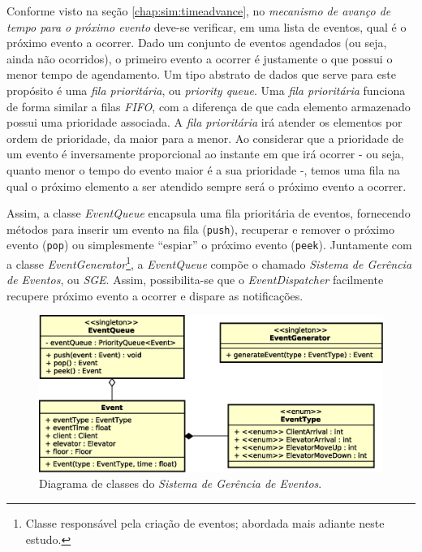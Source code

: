 Conforme visto na seção \ref{chap:sim:timeadvance}, no \textit{mecanismo de
avanço de tempo para o próximo evento} deve-se verificar, em uma lista de
eventos, qual é o próximo evento a ocorrer. Dado um conjunto de eventos
agendados (ou seja, ainda não ocorridos), o primeiro evento a ocorrer é
justamente o que possui o menor tempo de agendamento. Um tipo abstrato de dados
que serve para este propósito é uma \textit{fila prioritária}, ou
\textit{priority queue}. Uma \textit{fila prioritária} funciona de forma similar
a filas \textit{FIFO}, com a diferença de que cada elemento armazenado possui
uma prioridade associada. A \textit{fila prioritária} irá atender os elementos
por ordem de prioridade, da maior para a menor. Ao considerar que a prioridade
de um evento é inversamente proporcional ao instante em que irá ocorrer - ou
seja, quanto menor o tempo do evento maior é a sua prioridade -, temos uma fila
na qual o próximo elemento a ser atendido sempre será o próximo evento a
ocorrer.

Assim, a classe \textit{EventQueue} encapsula uma fila prioritária de eventos,
fornecendo métodos para inserir um evento na fila (\texttt{push}), recuperar e
remover o próximo evento (\texttt{pop}) ou simplesmente ``espiar'' o próximo
evento (\texttt{peek}). Juntamente com a classe
\textit{EventGenerator}\footnote{Classe responsável pela criação de eventos;
abordada mais adiante neste estudo.}, a \textit{EventQueue} compõe o chamado
\textit{Sistema de Gerência de Eventos}, ou \textit{SGE}. Assim, possibilita-se
que o \textit{EventDispatcher} facilmente recupere próximo evento a ocorrer e
dispare as notificações.

\begin{figure}[htb!]
  \centering
  \includegraphics[scale=0.6]{img/event_management.eps}
  \caption{Diagrama de classes do \textit{Sistema de Gerência de Eventos}.}
\label{fig:diagram:event:manage}
\end{figure}


